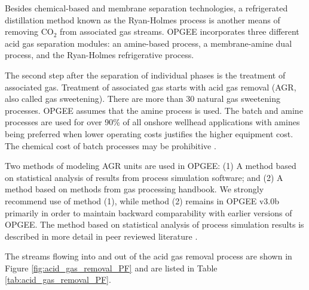 \documentclass[11pt]{report}
\newcommand{\version}{v3.0b }
\begin{document}
Besides chemical-based and membrane separation technologies, a refrigerated distillation method known as the Ryan-Holmes process is another means of removing CO$_{2}$ from associated gas streams. OPGEE incorporates three different acid gas separation modules: an amine-based process, a membrane-amine dual process, and the Ryan-Holmes refrigerative process. 

The second step after the separation of individual phases is the treatment of associated gas. Treatment of associated gas starts with acid gas removal (AGR, also called gas sweetening). There are more than 30 natural gas sweetening processes. OPGEE assumes that the amine process is used. The batch and amine processes are used for over 90\% of all onshore wellhead applications with amines being preferred when lower operating costs justifies the higher equipment cost. The chemical cost of batch processes may be prohibitive \cite[p. 99]{Manning1991}. 

Two methods of modeling AGR units are used in OPGEE: (1) A method based on statistical analysis of results from process simulation software; and (2) A method based on methods from gas processing handbook. We strongly recommend use of method (1), while method (2) remains in OPGEE \version primarily in order to maintain backward comparability with earlier versions of OPGEE. The method based on statistical analysis of process simulation results is described in more detail in peer reviewed literature \cite{Masnadi2020}.

The streams flowing into and out of the acid gas removal process are shown in Figure \ref{fig:acid_gas_removal_PF} and are listed in Table \ref{tab:acid_gas_removal_PF}.
\end{document}

